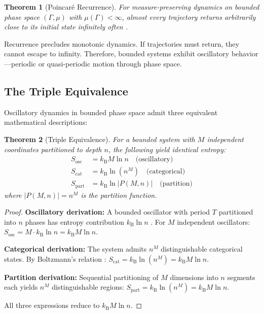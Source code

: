 \documentclass[10pt,twocolumn]{article}
\newtheorem{theorem}{Theorem}[section]
\theoremstyle{definition}
\theoremstyle{remark}
\newcommand{\kB}{k_{\mathrm{B}}}
\begin{document}
\begin{theorem}[Poincar\'{e} Recurrence]
For measure-preserving dynamics on bounded phase space $(\Gamma, \mu)$ with $\mu(\Gamma) < \infty$, almost every trajectory returns arbitrarily close to its initial state infinitely often \cite{walters1982,arnold1989}.
\end{theorem}

Recurrence precludes monotonic dynamics. If trajectories must return, they cannot escape to infinity. Therefore, bounded systems exhibit oscillatory behavior---periodic or quasi-periodic motion through phase space.

\subsection{The Triple Equivalence}

Oscillatory dynamics in bounded phase space admit three equivalent mathematical descriptions:

\begin{theorem}[Triple Equivalence]
\label{thm:triple}
For a bounded system with $M$ independent coordinates partitioned to depth $n$, the following yield identical entropy:
\begin{align}
S_{\text{osc}} &= \kB M \ln n \quad \text{(oscillatory)} \\
S_{\text{cat}} &= \kB \ln(n^M) \quad \text{(categorical)} \\
S_{\text{part}} &= \kB \ln|P(M,n)| \quad \text{(partition)}
\end{align}
where $|P(M,n)| = n^M$ is the partition function.
\end{theorem}

\begin{proof}
\textbf{Oscillatory derivation:} A bounded oscillator with period $T$ partitioned into $n$ phases has entropy contribution $\kB \ln n$ \cite{boltzmann1877}. For $M$ independent oscillators: $S_{\text{osc}} = M \cdot \kB \ln n = \kB M \ln n$.

\textbf{Categorical derivation:} The system admits $n^M$ distinguishable categorical states. By Boltzmann's relation \cite{gibbs1902}: $S_{\text{cat}} = \kB \ln(n^M) = \kB M \ln n$.

\textbf{Partition derivation:} Sequential partitioning of $M$ dimensions into $n$ segments each yields $n^M$ distinguishable regions: $S_{\text{part}} = \kB \ln(n^M) = \kB M \ln n$.

All three expressions reduce to $\kB M \ln n$.
\end{proof}
\end{document}
